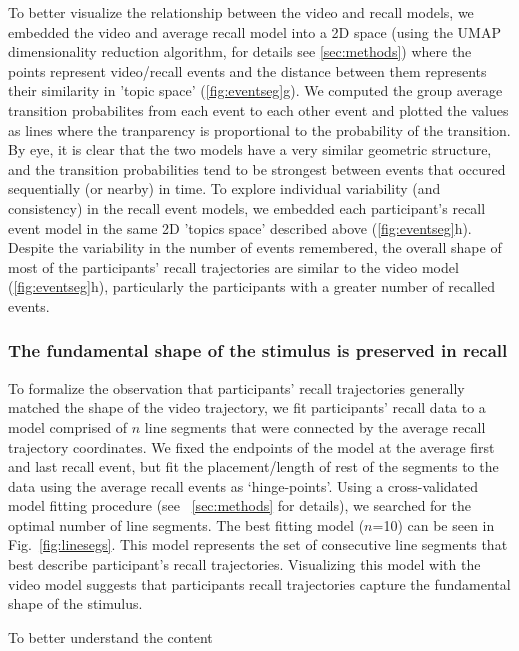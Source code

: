 \documentclass{article}
\begin{document}
{To better visualize the relationship between the video and recall models, we embedded the video and average recall model into a 2D space (using the UMAP dimensionality reduction algorithm, for details see \ref{sec:methods}) where the points represent video/recall events and the distance between them represents their similarity in 'topic space' (\ref{fig:eventseg}g). We computed the group average transition probabilites from each event to each other event and plotted the values as lines where the tranparency is proportional to the probability of the transition.  By eye, it is clear that the two models have a very similar geometric structure, and the transition probabilities tend to be strongest between events that occured sequentially (or nearby) in time. To explore individual variability (and consistency) in the recall event models, we embedded each participant's recall event model in the same 2D 'topics space' described above (\ref{fig:eventseg}h). Despite the variability in the number of events remembered, the overall shape of most of the participants' recall trajectories are similar to the video model (\ref{fig:eventseg}h), particularly the participants with a greater number of recalled events.

\subsubsection{The fundamental shape of the stimulus is preserved in recall}
To formalize the observation that participants' recall trajectories generally matched the shape of the video trajectory, we fit participants' recall data to a model comprised of $n$ line segments that were connected by the average recall trajectory coordinates. We fixed the endpoints of the model at the average first and last recall event, but fit the placement/length of rest of the segments to the data using the average recall events as `hinge-points'. Using a cross-validated model fitting procedure (see ~\ref{sec:methods} for details), we searched for the optimal number of line segments. The best fitting model ($n$=10) can be seen in Fig.~\ref{fig:linesegs}. This model represents the set of consecutive line segments that best describe participant's recall trajectories. Visualizing this model with the video model suggests that participants recall trajectories capture the fundamental shape of the stimulus.


To better understand the content


}
\end{document}

